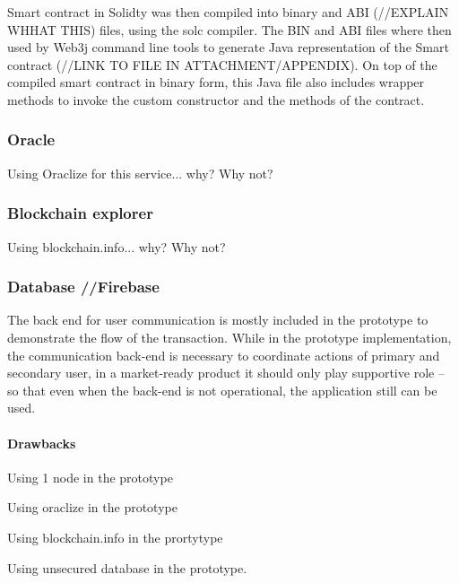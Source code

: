 Smart contract in Solidty was then compiled into binary and ABI (//EXPLAIN WHHAT THIS) files, using the solc compiler. The BIN and ABI files where then used by Web3j command line tools to generate Java representation of the Smart contract (//LINK TO FILE IN ATTACHMENT/APPENDIX). On top of the compiled smart contract in binary form, this Java file also includes wrapper methods to invoke the custom constructor and the methods of the contract.

% 
\subsubsection{Oracle}

Using Oraclize for this service... why? Why not?
% 
\subsubsection{Blockchain explorer}
Using blockchain.info... why? Why not?

\subsubsection{Database //Firebase}
The back end for user communication is mostly included in the prototype to demonstrate the flow of the transaction. While in the prototype implementation, the communication back-end is necessary to coordinate actions of primary and secondary user, in a market-ready product it should only play supportive role -- so that even when the back-end is not operational, the application still can be used.


\paragraph{Drawbacks}
Using 1 node in the prototype

Using oraclize in the prototype

Using blockchain.info in the prortytype

Using unsecured database in the prototype.